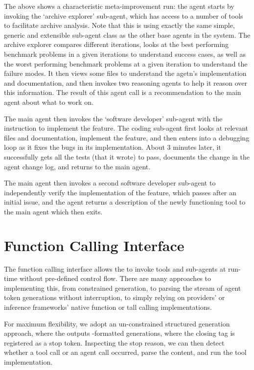 The above shows a characteristic meta-improvement run: the agent starts by invoking the `archive explorer' sub-agent, which has access to a number of tools to facilitate archive analysis. Note that this is using exactly the same simple, generic and extensible sub-agent class as the other base agents in the system. The archive explorer compares different iterations, looks at the best performing benchmark problems in a given iterations to understand success cases, as well as the worst performing benchmark problems at a given iteration to understand the failure modes. It then views some files to understand the agetn's implementation and documentation, and then invokes two reasoning agents to help it reason over this information. The result of this agent call is a recommendation to the main agent about what to work on.

The main agent then invokes the `software developer' sub-agent with the
instruction to implement the feature. The coding sub-agent first looks at
relevant files and documentation, implement the feature, and then enters into a
debugging loop as it fixes the bugs in its implementation. About 3 minutes
later, it successfully gets all the tests (that it wrote) to pass, documents the
change in the agent change log, and returns to the main agent.

The main agent then invokes a second software developer sub-agent to
independently verify the implementation of the feature, which passes after an
initial issue, and the agent returns a description of the newly functioning tool
to the main agent which then exits.

\section{Function Calling Interface}%
\label{sec:function_calling}

The  function calling interface allows the  to invoke tools and sub-agents at run-time without pre-defined control flow.
There are many approaches to implementing this, from constrained generation, to parsing the stream of agent token generations without interruption, to simply relying on  providers' or inference frameworks' native function or tall calling implementations.

For maximum flexibility, we adopt an un-constrained structured generation
approach, where the  outputs -formatted generations, where the
closing tag is registered as a stop token. Inspecting the stop reason, we can
then detect whether a tool call or an agent call occurred, parse the content,
and run the tool implementation.

